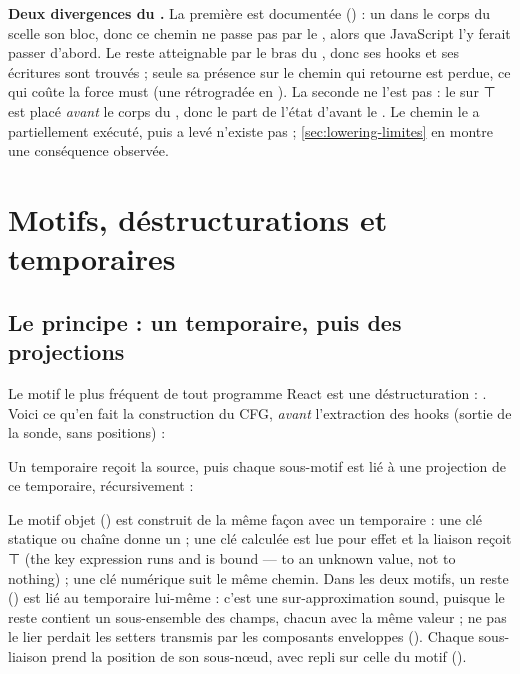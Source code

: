 \begin{piege}
\textbf{Deux divergences du .} La première est documentée () : un  dans le corps du  scelle son bloc, donc ce chemin ne passe pas par le , alors que JavaScript l'y ferait passer d'abord. Le  reste atteignable par le bras du , donc ses hooks et ses écritures sont trouvés ; seule sa présence sur le chemin qui retourne est perdue, ce qui coûte la force must (une \Error{} rétrogradée en \Warning{}). La seconde ne l'est pas : le  sur ⊤ est placé \emph{avant} le corps du , donc le  part de l'état d'avant le . Le chemin \og le  a partiellement exécuté, puis a levé\fg{} n'existe pas ; \cref{sec:lowering-limites} en montre une conséquence observée.
\end{piege}

\section{Motifs, déstructurations et temporaires}
\label{sec:lowering-motifs}

\subsection{Le principe : un temporaire, puis des projections}

Le motif le plus fréquent de tout programme React est une déstructuration : . Voici ce qu'en fait la construction du CFG, \emph{avant} l'extraction des hooks (sortie  de la sonde, sans positions) :


Un temporaire reçoit la source, puis chaque sous-motif est lié à une projection de ce temporaire, récursivement :


Le motif objet () est construit de la même façon avec un temporaire  : une clé statique ou chaîne donne un  ; une clé calculée \code{[k]} est lue pour effet et la liaison reçoit ⊤ (\og the key expression runs and  is bound --- to an unknown value, not to nothing\fg{}) ; une clé numérique suit le même chemin. Dans les deux motifs, un reste () est lié au temporaire lui-même : c'est une sur-approximation sound, puisque le reste contient un sous-ensemble des champs, chacun avec la même valeur ; ne pas le lier perdait les setters transmis par les composants enveloppes (). Chaque sous-liaison prend la position de son sous-nœud, avec repli sur celle du motif ().

